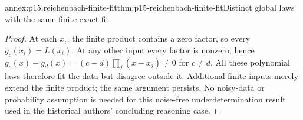 \begin{annexitem}{annex:p15.reichenbach-finite-fit}{thm:p15-reichenbach-finite-fit}{Distinct global laws with the same finite exact fit}
\begin{proof}
At each \(x_i\), the finite product contains a zero factor, so
every \(g_c(x_i)=L(x_i)\). At any other input every factor is
nonzero, hence
\(g_c(x)-g_d(x)=(c-d)\prod_j(x-x_j)\ne0\) for \(c\ne d\).
All these polynomial laws therefore fit the data but disagree outside
it. Additional finite inputs merely extend the finite product; the
same argument persists. No noisy-data or probability assumption is
needed for this noise-free underdetermination result used in the
historical authors' concluding reasoning case.
\end{proof}
\end{annexitem}
